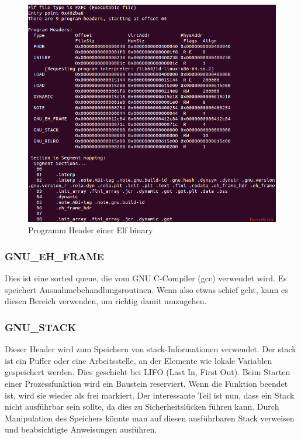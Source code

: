 \begin{figure}[H]
    \begin{center}
        \includegraphics[scale=0.5]{images/elf-program-headers-segments.png}
        \caption{Programm Header einer Elf binary \cite{program_headers_of_Elf_binary}}
    \end{center}
\end{figure}

\subsubsection{GNU\_EH\_FRAME}
Dies ist eine sorted queue, die vom GNU C-Compiler (gcc) verwendet wird. Es speichert Ausnahmebehandlungsroutinen. Wenn also etwas schief geht, kann es diesen Bereich verwenden, um richtig damit umzugehen.

\subsubsection{GNU\_STACK}
Dieser Header wird zum Speichern von stack-Informationen verwendet. Der stack ist ein Puffer oder eine Arbeitsstelle, an der Elemente wie lokale Variablen gespeichert werden. Dies geschieht bei LIFO (Last In, First Out). Beim Starten einer Prozessfunktion wird ein Baustein reserviert. Wenn die Funktion beendet ist, wird sie wieder als frei markiert. Der interessante Teil ist nun, dass ein Stack nicht ausführbar sein sollte, da dies zu Sicherheitslücken führen kann. Durch Manipulation des Speichers könnte man auf diesen ausführbaren Stack verweisen und beabsichtigte Anweisungen ausführen.

